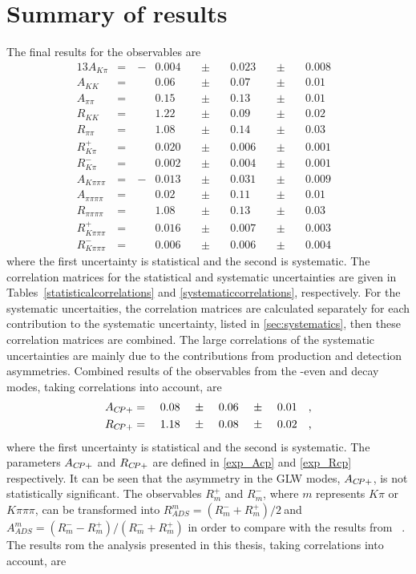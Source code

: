 \section{Summary of results}
\label{sec:cpfit:summary}

The final results for the \CP observables are  
\begin{alignat*}{13}
A_{K\pi} &= &\ -&0.004&\ &\pm&\ &0.023&\ &\pm&\ &0.008& \\
A_{KK} &= &&0.06&\ &\pm&\ &0.07&\ &\pm&\ &0.01& \\
A_{\pi\pi} &= &&0.15&\ &\pm&\ &0.13&\ &\pm&\ &0.01& \\
R_{KK} &= &&1.22&\ &\pm&\ &0.09&\ &\pm&\ &0.02& \\
R_{\pi\pi} &= &&1.08&\ &\pm&\ &0.14&\ &\pm&\ &0.03& \\
R^+_{K\pi} &= &&0.020&\ &\pm&\ &0.006&\ &\pm&\ &0.001& \\ 
R^-_{K\pi} &= &&0.002&\ &\pm&\ &0.004&\ &\pm&\ &0.001& \\
A_{K\pi\pi\pi} &= &\ -&0.013&\ &\pm&\ &0.031&\ &\pm&\ &0.009& \\
A_{\pi\pi\pi\pi} &= &&0.02&\ &\pm&\ &0.11&\ &\pm&\ &0.01& \\
R_{\pi\pi\pi\pi} &= &&1.08&\ &\pm&\ &0.13&\ &\pm&\ &0.03& \\
R^+_{K\pi\pi\pi} &= &&0.016&\ &\pm&\ &0.007&\ &\pm&\ &0.003& \\ 
R^-_{K\pi\pi\pi} &= &&0.006&\ &\pm&\ &0.006&\ &\pm&\ &0.004&
\end{alignat*}
where the first uncertainty is statistical and the second is systematic. The correlation matrices for the statistical and systematic uncertainties are given in Tables~\ref{statisticalcorrelations} and \ref{systematiccorrelations}, respectively. For the systematic uncertaities, the correlation matrices are calculated separately for each contribution to the systematic uncertainty, listed in \sect\ref{sec:systematics}, then these correlation matrices are combined. The large correlations of the systematic uncertainties are mainly due to the contributions from production and detection asymmetries. Combined results of the \CP observables from the \CP-even \kk and \pipi decay modes, taking correlations into account, are
\begin{alignat*}{13}
A_{\CP+} &= &\ &0.08&\ &\pm&\ &0.06&\ &\pm&\ &0.01& \text{,}\\
R_{\CP+} &= &\ &1.18&\ &\pm&\ &0.08&\ &\pm&\ &0.02& \text{,}
\end{alignat*}
where the first uncertainty is statistical and the second is systematic. The parameters $A_{{C\!P}+}$ and $R_{{C\!P}+}$ are defined in \eqns\ref{exp_Acp} and \ref{exp_Rcp} respectively. It can be seen that the asymmetry in the GLW modes, $A_{{C\!P}+}$, is not statistically significant. The \CP observables $R^+_m$ and $R^-_m$, where $m$ represents $K\pi$ or $K\pi\pi\pi$, can be transformed into $R_{ADS}^m = \left(R^-_m + R^+_m\right)/2\ $and \mbox{$A_{ADS}^m = \left(R^-_m - R^+_m\right)/\left(R^-_m + R^+_m\right)$} in order to compare with the results from \babar~\cite{BaBarDKstar}. The results rom the analysis presented in this thesis, taking correlations into account, are
